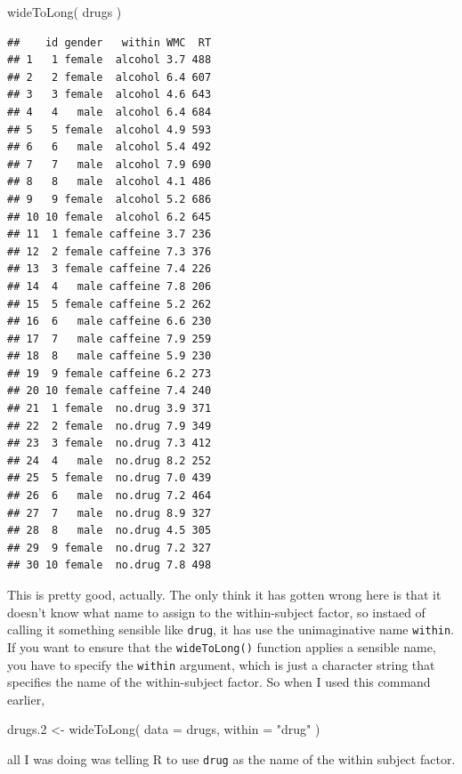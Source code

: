 \documentclass[
]{book}
\newenvironment{Shaded}{\begin{snugshade}}{\end{snugshade}}
\newcommand{\AttributeTok}[1]{\textcolor[rgb]{0.77,0.63,0.00}{#1}}
\newcommand{\FloatTok}[1]{\textcolor[rgb]{0.00,0.00,0.81}{#1}}
\newcommand{\FunctionTok}[1]{\textcolor[rgb]{0.00,0.00,0.00}{#1}}
\newcommand{\NormalTok}[1]{#1}
\newcommand{\OtherTok}[1]{\textcolor[rgb]{0.56,0.35,0.01}{#1}}
\newcommand{\StringTok}[1]{\textcolor[rgb]{0.31,0.60,0.02}{#1}}
\begin{document}
\begin{Shaded}
\begin{Highlighting}[]
\FunctionTok{wideToLong}\NormalTok{( drugs )}
\end{Highlighting}
\end{Shaded}

\begin{verbatim}
##    id gender   within WMC  RT
## 1   1 female  alcohol 3.7 488
## 2   2 female  alcohol 6.4 607
## 3   3 female  alcohol 4.6 643
## 4   4   male  alcohol 6.4 684
## 5   5 female  alcohol 4.9 593
## 6   6   male  alcohol 5.4 492
## 7   7   male  alcohol 7.9 690
## 8   8   male  alcohol 4.1 486
## 9   9 female  alcohol 5.2 686
## 10 10 female  alcohol 6.2 645
## 11  1 female caffeine 3.7 236
## 12  2 female caffeine 7.3 376
## 13  3 female caffeine 7.4 226
## 14  4   male caffeine 7.8 206
## 15  5 female caffeine 5.2 262
## 16  6   male caffeine 6.6 230
## 17  7   male caffeine 7.9 259
## 18  8   male caffeine 5.9 230
## 19  9 female caffeine 6.2 273
## 20 10 female caffeine 7.4 240
## 21  1 female  no.drug 3.9 371
## 22  2 female  no.drug 7.9 349
## 23  3 female  no.drug 7.3 412
## 24  4   male  no.drug 8.2 252
## 25  5 female  no.drug 7.0 439
## 26  6   male  no.drug 7.2 464
## 27  7   male  no.drug 8.9 327
## 28  8   male  no.drug 4.5 305
## 29  9 female  no.drug 7.2 327
## 30 10 female  no.drug 7.8 498
\end{verbatim}

This is pretty good, actually. The only think it has gotten wrong here is that it doesn't know what name to assign to the within-subject factor, so instaed of calling it something sensible like \texttt{drug}, it has use the unimaginative name \texttt{within}. If you want to ensure that the \texttt{wideToLong()} function applies a sensible name, you have to specify the \texttt{within} argument, which is just a character string that specifies the name of the within-subject factor. So when I used this command earlier,

\begin{Shaded}
\begin{Highlighting}[]
\NormalTok{drugs}\FloatTok{.2} \OtherTok{\textless{}{-}} \FunctionTok{wideToLong}\NormalTok{( }\AttributeTok{data =}\NormalTok{ drugs, }\AttributeTok{within =} \StringTok{"drug"}\NormalTok{ )}
\end{Highlighting}
\end{Shaded}

all I was doing was telling R to use \texttt{drug} as the name of the within subject factor.
\end{document}
